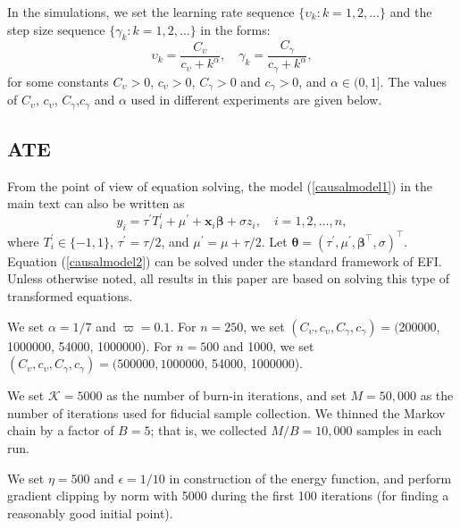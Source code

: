 \documentclass[11pt]{article}
\newcommand{\bx}{{\boldsymbol x}}
\newcommand{\mK}{\mathcal{K}}
\newcommand{\bbeta}{{\boldsymbol \beta}}
\newcommand{\btheta}{{\boldsymbol \theta}}
\begin{document}
 

In the simulations, we set the learning rate sequence $\{\upsilon_k: k=1,2,\ldots\}$ and the step size sequence $\{\gamma_k: k=1,2,\ldots\}$ in the forms:
\[
\upsilon_k=\frac{C_{\upsilon}}{c_{\upsilon}+k^{\alpha}}, \quad  
\gamma_k=\frac{C_{\gamma}}{c_{\gamma}+k^{\alpha}},
\]
for some constants $C_{\upsilon}>0$, $c_{\upsilon}>0$, $C_{\gamma}>0$ and $c_{\gamma}>0$, and $\alpha \in (0,1]$. 
The values of $C_{\upsilon}$, $c_{\upsilon}$, $C_{\gamma}$,$c_{\gamma}$ and $\alpha$ used in different experiments are given below. 


\subsection{ATE}

 
From the point of view  of equation solving, the model (\ref{causalmodel1}) in the main text can also  be written as 
\begin{equation} \label{causalmodel2}
y_i=\tau^{\prime} T_i^{\prime} +\mu^{\prime}+\bx_i \bbeta+\sigma z_i, \quad i=1,2,\ldots,n,
\end{equation}
where $T_i^{\prime}\in \{-1,1\}$, $\tau^{\prime}=\tau/2$, and $\mu^{\prime}=\mu+\tau/2$. 
Let $\btheta=(\tau^{\prime},\mu^{\prime},\bbeta^{\top},\sigma)^{\top}$. Equation (\ref{causalmodel2}) can be solved under the standard framework of EFI.
Unless otherwise noted, all results in this paper are  based on solving 
this type of transformed equations. 


We set $\alpha=1/7$ and $\varpi=0.1$.
For $n=250$, we set 
$(C_{\upsilon},c_{\upsilon},C_{\gamma},c_{\gamma})=($200000, 1000000, 54000, 1000000).
For $n=500$ and 1000, we set 
$(C_{\upsilon},c_{\upsilon},C_{\gamma},c_{\gamma})=(500000, 1000000$, 54000, 1000000).

We set $\mK=5000$ as the number of burn-in iterations, and set $M=50,000$ as the number of iterations used for fiducial sample collection. We thinned the Markov chain by a factor of $B=5$; that is, we collected $M/B=10,000$ samples in each run. 

We set $\eta=500$ and $\epsilon=1/10$ in construction of the energy function, and perform gradient clipping by norm with 5000 during the first 
100 iterations (for finding a reasonably good initial point).  
\end{document}
